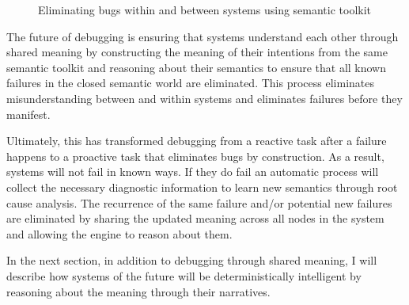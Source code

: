 \begin{figure}[htbp]
    \centering
    
    \caption{Eliminating bugs within and between systems using semantic toolkit}
    \label{fig:future_debugging}
\end{figure}

The future of debugging is ensuring that systems understand each other through shared meaning by constructing the meaning of their intentions from the same semantic toolkit and reasoning about their semantics to ensure that all known failures in the closed semantic world are eliminated. This process eliminates misunderstanding between and within systems and eliminates failures before they manifest.

Ultimately, this has transformed debugging from a reactive task after a failure happens to a proactive task that eliminates bugs by construction. As a result, systems will not fail in known ways. If they do fail an automatic process will collect the necessary diagnostic information to learn new semantics through root cause analysis. The recurrence of the same failure and/or potential new failures are eliminated by sharing the updated meaning across all nodes in the system and allowing the engine to reason about them.

In the next section, in addition to debugging through shared meaning, I will describe how systems of the future will be deterministically intelligent by reasoning about the meaning through their narratives.